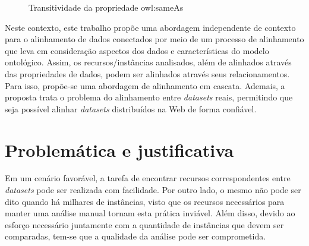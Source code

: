 \begin{figure}[h]
	\centering
		\caption{Transitividade da propriedade owl:sameAs}
		\label{sameAsSample}
\end{figure}


Neste contexto, este trabalho propõe uma abordagem independente de contexto para o alinhamento de dados conectados por meio de um processo de alinhamento que leva em consideração aspectos dos dados e  características do modelo ontológico.
Assim, os recursos/instâncias analisados, além de alinhados através das propriedades de dados, podem ser alinhados através seus relacionamentos. Para isso, propõe-se uma abordagem de alinhamento em cascata. Ademais, a proposta trata o problema do alinhamento entre \textit{datasets} reais, permitindo que seja possível alinhar \textit{datasets} distribuídos na Web de forma confiável.

\section{Problemática e justificativa}
Em um cenário favorável, a tarefa de encontrar recursos correspondentes entre \textit{datasets} pode ser realizada com facilidade. Por outro lado, o mesmo não pode ser dito quando há milhares de instâncias, visto que os recursos necessários para manter uma análise manual tornam esta prática inviável. Além disso, devido ao esforço necessário juntamente com a quantidade de instâncias que devem ser comparadas, tem-se que a qualidade da análise pode ser comprometida.

